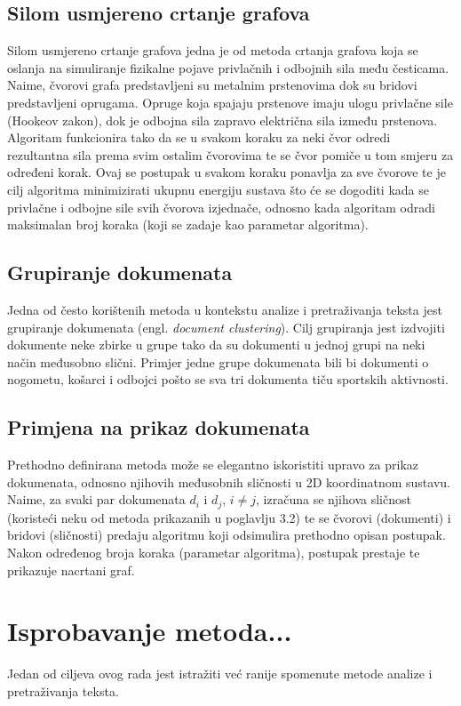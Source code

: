 \documentclass[times, utf8, zavrsni]{fer}
\begin{document}
\section{Silom usmjereno crtanje grafova}
Silom usmjereno crtanje grafova jedna je od metoda crtanja grafova koja se oslanja na simuliranje fizikalne pojave privlačnih i odbojnih sila među česticama. Naime, čvorovi grafa predstavljeni su metalnim prstenovima dok su bridovi predstavljeni oprugama. Opruge koja spajaju prstenove imaju ulogu privlačne sile (Hookeov zakon), dok je odbojna sila zapravo električna sila između prstenova. Algoritam funkcionira tako da se u svakom koraku za neki čvor odredi rezultantna sila prema svim ostalim čvorovima te se čvor pomiče u tom smjeru za određeni korak. Ovaj se postupak u svakom koraku ponavlja za sve čvorove te je cilj algoritma minimizirati ukupnu energiju sustava što će se dogoditi kada se privlačne i odbojne sile svih čvorova izjednače, odnosno kada algoritam odradi maksimalan broj koraka (koji se zadaje kao parametar algoritma).

\section{Grupiranje dokumenata}
Jedna od često korištenih metoda u kontekstu analize i pretraživanja teksta jest grupiranje dokumenata (engl. \textit{document clustering}). Cilj grupiranja jest izdvojiti dokumente neke zbirke u grupe tako da su dokumenti u jednoj grupi na neki način međusobno slični. Primjer jedne grupe dokumenata bili bi dokumenti o nogometu, košarci i odbojci pošto se sva tri dokumenta tiču sportskih aktivnosti.


\section{Primjena na prikaz dokumenata}
Prethodno definirana metoda može se elegantno iskoristiti upravo za prikaz dokumenata, odnosno njihovih međusobnih sličnosti u 2D koordinatnom sustavu. Naime, za svaki par dokumenata $d_{i}$ i $d_{j}$, $i \neq j$, izračuna se njihova sličnost (koristeći neku od metoda prikazanih u poglavlju 3.2) te se čvorovi (dokumenti) i bridovi (sličnosti) predaju algoritmu koji odsimulira prethodno opisan postupak. Nakon određenog broja koraka (parametar algoritma), postupak prestaje te prikazuje nacrtani graf.

\chapter{Isprobavanje metoda...}
Jedan od ciljeva ovog rada jest istražiti već ranije spomenute metode analize i pretraživanja teksta.
\end{document}

